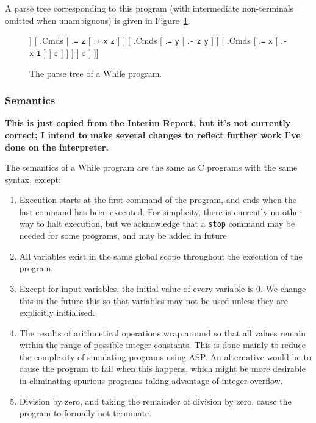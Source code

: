 \documentclass[a4paper,twoside,notitlepage]{article}
\newcommand{\ttt}{\texttt}
\begin{document}
A parse tree corresponding to this program (with intermediate non-terminals 
omitted when unambiguous) is given in Figure~\ref{fig:fibtree}.

\begin{figure}[h]
  \caption{The parse tree of a While program.}
  \label{fig:fibtree}
  \Tree[ .Prog [ .Cmds
    [ .\ttt{=} \ttt{x} \ttt{1} ]
    [ .Cmds
      [ .\ttt{while}
        [ .Bool [ .\ttt{<} \ttt{1} \ttt{x} ] ]
        [ .Cmds
          [ .\ttt{=} \ttt{z} [ .\ttt{+} \ttt{x} \ttt{z} ] ]
            [ .Cmds
              [ .\ttt{=} \ttt{y} [ .\ttt{-} \ttt{z} \ttt{y} ] ]
              [ .Cmds
                [ .\ttt{=} \ttt{x} [ .\ttt{-} \ttt{x} \ttt{1} ] ]
                $\varepsilon$
              ]
            ]
          ]
        ]
      $\varepsilon$
    ]
  ]]
\end{figure}

\subsubsection{Semantics}
\textbf{This is just copied from the Interim Report, but it's not 
currently correct; I intend to make several changes to reflect further 
work I've done on the interpreter.}

The semantics of a While program are the same as C programs with the same 
syntax, except:
\begin{enumerate}
    \item Execution starts at the first command of the program, and ends when 
    the last command has been executed. For simplicity, there is currently no 
    other way to halt execution, but we acknowledge that a \ttt{stop} command 
    may be needed for some programs, and may be added in future.
    \item All variables exist in the same global scope throughout the 
    execution of the program.
    \item Except for input variables, the initial value of every variable is 0.
    We change this in the future this so that variables may not be used unless 
    they are explicitly initialised.
    \item The results of arithmetical operations wrap around so that all 
    values remain within the range of possible integer constants. This is done 
    mainly to reduce the complexity of simulating programs using ASP. An 
    alternative would be to cause the program to fail when this happens, which 
    might be more desirable in eliminating spurious programs taking advantage 
    of integer overflow.
    \item Division by zero, and taking the remainder of division by zero,
    cause the program to formally not terminate.
\end{enumerate}
\end{document}
